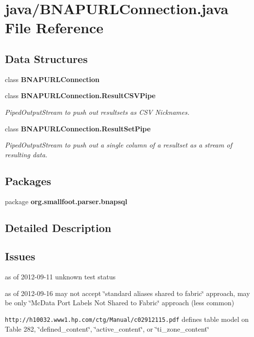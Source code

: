 \section{java/\+B\+N\+A\+P\+U\+R\+L\+Connection.java File Reference}
\label{BNAPURLConnection_8java}
\subsection*{Data Structures}
\begin{DoxyCompactItemize}
\item 
class {\bf B\+N\+A\+P\+U\+R\+L\+Connection}
\item 
class {\bfseries B\+N\+A\+P\+U\+R\+L\+Connection.\+Result\+C\+S\+V\+Pipe}
\begin{DoxyCompactList}\small\item\em Piped\+Output\+Stream to push out resultsets as C\+S\+V Nicknames. \end{DoxyCompactList}\item 
class {\bfseries B\+N\+A\+P\+U\+R\+L\+Connection.\+Result\+Set\+Pipe}
\begin{DoxyCompactList}\small\item\em Piped\+Output\+Stream to push out a single column of a resultset as a stream of resulting data. \end{DoxyCompactList}\end{DoxyCompactItemize}
\subsection*{Packages}
\begin{DoxyCompactItemize}
\item 
package {\bf org.\+smallfoot.\+parser.\+bnapsql}
\end{DoxyCompactItemize}


\subsection{Detailed Description}
\subsection{Issues}\label{BNAPURLConnection_8java_Known}

\begin{DoxyItemize}
\item as of 2012-\/09-\/11 unknown test status
\item as of 2012-\/09-\/16 may not accept \char`\"{}standard aliases shared to fabric\char`\"{} approach, may be only \char`\"{}\+Mc\+Data Port Labels Not Shared to Fabric\char`\"{} approach (less common)
\begin{DoxyItemize}
\item {\tt http\+://h10032.\+www1.\+hp.\+com/ctg/\+Manual/c02912115.\+pdf} defines table model on Table 282, \char`\"{}defined\+\_\+content\char`\"{}, \char`\"{}active\+\_\+content\char`\"{}, or \char`\"{}ti\+\_\+zone\+\_\+content\char`\"{} 
\end{DoxyItemize}
\end{DoxyItemize}